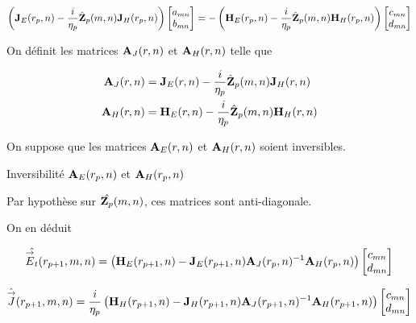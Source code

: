         \begin{equation}
            \left(\mathbf{J}_{E}(r_p,n) - \dfrac{i}{\eta_p}\hat{\mathbf{Z}}_p(m,n)\mathbf{J}_{H}(r_p,n) \right)
            \begin{bmatrix}
                a_{mn}
                \\
                b_{mn}
            \end{bmatrix}
            = -
            \left(\mathbf{H}_{E}(r_p,n) - \dfrac{i}{\eta_p}\hat{\mathbf{Z}}_p(m,n)\mathbf{H}_{H}(r_p,n) \right)
            \begin{bmatrix}
                c_{mn}
                \\
                d_{mn}
            \end{bmatrix}
        \end{equation}

        On définit les matrices \(\mathbf{A}_{J}(r,n)\) et \(\mathbf{A}_{H}(r,n)\) telle que

        \begin{align}
            \mathbf{A}_{J}(r,n) &= \mathbf{J}_{E}(r,n) - \dfrac{i}{\eta_p}\hat{\mathbf{Z}}_p(m,n)\mathbf{J}_{H}(r,n)
            \\
            \mathbf{A}_{H}(r,n) &= \mathbf{H}_{E}(r,n) - \dfrac{i}{\eta_p}\hat{\mathbf{Z}}_p(m,n)\mathbf{H}_{H}(r,n)
        \end{align}

        On suppose que les matrices \(\mathbf{A}_{E}(r,n)\) et \(\mathbf{A}_{H}(r,n)\) soient inversibles.

        \begin{TODO}
          Inversibilité \(\mathbf{A}_{E}(r_p,n)\) et \(\mathbf{A}_{H}(r_p,n)\)
        \end{TODO}

        Par hypothèse sur \(\hat{\mathbf{Z}_p}(m,n)\), ces matrices sont anti-diagonale.

        On en déduit

        \begin{equation}
            \hat{{\overset{\rightarrow}{E}}_t}(r_{p+1},m,n) = 
            \left(
                \mathbf{H}_{E}(r_{p+1},n)
                -
                \mathbf{J}_{E}(r_{p+1},n)
                \mathbf{A}_{J}(r_p,n)^{-1}
                \mathbf{A}_{H}(r_p,n)
            \right)
            \begin{bmatrix}
                c_{mn}
                \\
                d_{mn}
            \end{bmatrix}
        \end{equation}


        \begin{equation}
            \hat{{\overset{\rightarrow}{J}}}(r_{p+1},m,n) = \dfrac{i}{\eta_p}
            \left(
                \mathbf{H}_{H}(r_{p+1},n)
                -
                \mathbf{J}_{H}(r_{p+1},n)
                \mathbf{A}_{J}(r_{p+1},n)^{-1}
                \mathbf{A}_{H}(r_{p+1},n)
            \right)
            \begin{bmatrix}
                c_{mn}
                \\
                d_{mn}
            \end{bmatrix}
        \end{equation}

